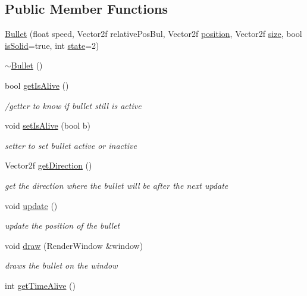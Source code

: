 \subsection*{Public Member Functions}
\begin{DoxyCompactItemize}
\item 
\hyperlink{class_bullet_a33aa7037c020e72ea614356dc1f7e67b}{Bullet} (float speed, Vector2f relative\+Pos\+Bul, Vector2f \hyperlink{class_entity_a6af9d6498134ad0906011778bc5736db}{position}, Vector2f \hyperlink{class_entity_ae9a0a364c85f91ade5088b3610131417}{size}, bool \hyperlink{class_entity_af1b0754c9d5f4afa73834b23c6437101}{is\+Solid}=true, int \hyperlink{class_entity_a4edd9cc2506add0d9e27fade0bf957e8}{state}=2)
\item 
\hyperlink{class_bullet_aaeb5cb41d7db89f49007b08b41f1bfcf}{$\sim$\+Bullet} ()
\item 
bool \hyperlink{class_bullet_a86ab78893d4a171e3215486efc6dc66b}{get\+Is\+Alive} ()
\begin{DoxyCompactList}\small\item\em /getter to know if bullet still is active \end{DoxyCompactList}\item 
void \hyperlink{class_bullet_a2f178ec7de59d5ff1edd975065b4f279}{set\+Is\+Alive} (bool b)
\begin{DoxyCompactList}\small\item\em setter to set bullet active or inactive \end{DoxyCompactList}\item 
Vector2f \hyperlink{class_bullet_a6b6acf4d172bc98a9371cc431eca4e0d}{get\+Direction} ()
\begin{DoxyCompactList}\small\item\em get the direction where the bullet will be after the next update \end{DoxyCompactList}\item 
void \hyperlink{class_bullet_a32f4a0611fe2dd245fee955d14ca1f68}{update} ()
\begin{DoxyCompactList}\small\item\em update the position of the bullet \end{DoxyCompactList}\item 
void \hyperlink{class_bullet_a14a795a7a6f4d0ad2e96a19b79afc5ee}{draw} (Render\+Window \&window)
\begin{DoxyCompactList}\small\item\em draws the bullet on the window \end{DoxyCompactList}\item 
int \hyperlink{class_bullet_a61627cf61a12182a8b8ac9c8a9277de5}{get\+Time\+Alive} ()
\end{DoxyCompactItemize}
